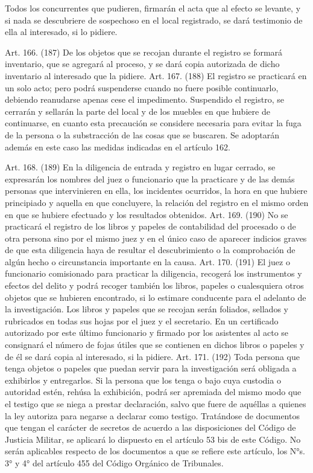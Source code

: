       Todos los concurrentes que pudieren, firmarán el acta que al efecto se levante, y si nada se descubriere de sospechoso en el local registrado, se dará testimonio de ella al interesado, si lo pidiere.

    Art. 166. (187) De los objetos que se recojan durante el registro se formará inventario, que se agregará al proceso, y se dará copia autorizada de dicho inventario al interesado que la pidiere.
    Art. 167. (188) El registro se practicará en un solo acto; pero podrá suspenderse cuando no fuere posible continuarlo, debiendo reanudarse apenas cese el impedimento.
    Suspendido el registro, se cerrarán y sellarán la parte del local y de los muebles en que hubiere de continuarse, en cuanto esta precaución se considere necesaria para evitar la fuga de la persona o la substracción de las cosas que se buscaren. Se adoptarán además en este caso las medidas indicadas en el artículo 162.

    Art. 168. (189) En la diligencia de entrada y registro en lugar cerrado, se expresarán los nombres del juez o funcionario que la practicare y de las demás personas que intervinieren en ella, los incidentes ocurridos, la hora en que hubiere principiado y aquella en que concluyere, la relación del registro en el mismo orden en que se hubiere efectuado y los resultados obtenidos.
    Art. 169. (190) No se practicará el registro de los libros y papeles de contabilidad del procesado o de otra persona sino por el mismo juez y en el único caso de aparecer indicios graves de que esta diligencia haya de resultar el descubrimiento o la comprobación de algún hecho o circunstancia importante en la causa.
    Art. 170. (191) El juez o funcionario comisionado para practicar la diligencia, recogerá los instrumentos y efectos del delito y podrá recoger también los libros, papeles o cualesquiera otros objetos que se hubieren encontrado, si lo estimare conducente para el adelanto de la investigación.
    Los libros y papeles que se recojan serán foliados, sellados y rubricados en todas sus hojas por el juez y el secretario. En un certificado autorizado por este último funcionario y firmado por los asistentes al acto se consignará el número de fojas útiles que se contienen en dichos libros o papeles y de él se dará copia al interesado, si la pidiere.
    Art. 171. (192) Toda persona que tenga objetos o papeles que puedan servir para la investigación será obligada a exhibirlos y entregarlos.
    Si la persona que los tenga o bajo cuya custodia o autoridad estén, rehúsa la exhibición, podrá ser apremiada del mismo modo que el testigo que se niega a prestar declaración, salvo que fuere de aquéllas a quienes la ley autoriza para negarse a declarar como testigo.
    Tratándose de documentos que tengan el carácter de secretos de acuerdo a las disposiciones del Código de Justicia Militar, se aplicará lo dispuesto en el artículo 53 bis de este Código.
    No serán aplicables respecto de los documentos a que se refiere este artículo, los N°s. 3° y 4° del artículo 455 del Código Orgánico de Tribunales.

